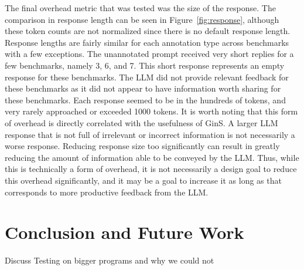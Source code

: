 \documentclass[sigconf]{acmart}
\begin{document}
The final overhead metric that was tested was the size of the response.
The comparison in response length can be seen in Figure~\ref{fig:response}, although these token counts are not normalized since there is no default response length.
Response lengths are fairly similar for each annotation type across benchmarks with a few exceptions.
The unannotated prompt received very short replies for a few benchmarks, namely 3, 6, and 7.
This short response represents an empty response for these benchmarks.
The LLM did not provide relevant feedback for these benchmarks as it did not appear to have information worth sharing for these benchmarks.
Each response seemed to be in the hundreds of tokens, and very rarely approached or exceeded 1000 tokens.
It is worth noting that this form of overhead is directly correlated with the usefulness of GinS.
A larger LLM response that is not full of irrelevant or incorrect information is not necessarily a worse response.
Reducing response size too significantly can result in greatly reducing the amount of information able to be conveyed by the LLM.
Thus, while this is technically a form of overhead, it is not necessarily a design goal to reduce this overhead significantly, and it may be a goal to increase it as long as that corresponds to more productive feedback from the LLM.


\section{Conclusion and Future Work}
Discuss Testing on bigger programs and why we could not




\end{document}
